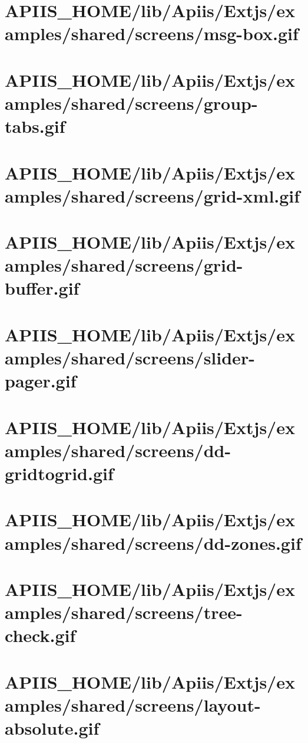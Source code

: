 \section{APIIS\_HOME/lib/Apiis/Extjs/examples/shared/screens/msg-box.gif} 
\section{APIIS\_HOME/lib/Apiis/Extjs/examples/shared/screens/group-tabs.gif} 
\section{APIIS\_HOME/lib/Apiis/Extjs/examples/shared/screens/grid-xml.gif} 
\section{APIIS\_HOME/lib/Apiis/Extjs/examples/shared/screens/grid-buffer.gif} 
\section{APIIS\_HOME/lib/Apiis/Extjs/examples/shared/screens/slider-pager.gif} 
\section{APIIS\_HOME/lib/Apiis/Extjs/examples/shared/screens/dd-gridtogrid.gif} 
\section{APIIS\_HOME/lib/Apiis/Extjs/examples/shared/screens/dd-zones.gif} 
\section{APIIS\_HOME/lib/Apiis/Extjs/examples/shared/screens/tree-check.gif} 
\section{APIIS\_HOME/lib/Apiis/Extjs/examples/shared/screens/layout-absolute.gif} 
